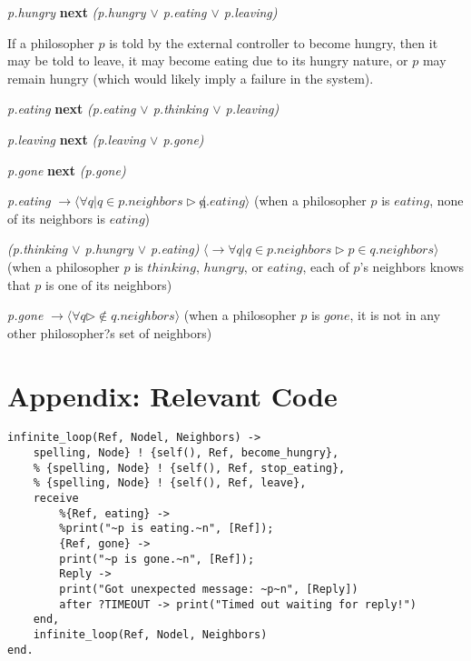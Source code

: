 \documentclass[11pt]{article}
\begin{document}
{\it p.hungry} {\bfseries next} {\it (p.hungry $\vee$ p.eating $\vee$ p.leaving)}

\indent If a philosopher $p$ is told by the external controller to become hungry, then it may be told to leave, it may become eating due to its hungry nature, or $p$ may remain hungry (which would likely imply a failure in the system).

{\it p.eating} {\bfseries next} {\it (p.eating $\vee$ p.thinking $\vee$ p.leaving)}

\indent

{\it p.leaving} {\bfseries next} {\it (p.leaving $\vee$ p.gone)}

\indent

{\it p.gone} {\bfseries next} {\it (p.gone)}

\indent

{\it p.eating} $\rightarrow \langle \forall q | q \in p.neighbors \rhd \not q.eating \rangle$
(when a philosopher $p$ is $eating$, none of its neighbors is $eating$)

\indent 

{\it (p.thinking $\vee$ p.hungry $\vee$ p.eating)} $\langle \rightarrow \forall q | q \in p.neighbors \rhd p \in q.neighbors \rangle$
(when a philosopher $p$ is $thinking$, $hungry$, or $eating$, each of $p$'s neighbors knows that $p$ is one of its neighbors)

\indent

{\it p.gone} $\rightarrow \langle \forall q  \rhd \not\in q.neighbors \rangle$
(when a philosopher $p$ is $gone$, it is not in any other philosopher?s set of neighbors)

\indent


\section{Appendix: Relevant Code}

\begin{lstlisting}
infinite_loop(Ref, Nodel, Neighbors) ->
    spelling, Node} ! {self(), Ref, become_hungry},
    % {spelling, Node} ! {self(), Ref, stop_eating},
    % {spelling, Node} ! {self(), Ref, leave},
    receive
        %{Ref, eating} ->          
        %print("~p is eating.~n", [Ref]);
        {Ref, gone} ->
        print("~p is gone.~n", [Ref]);
        Reply ->
        print("Got unexpected message: ~p~n", [Reply])
        after ?TIMEOUT -> print("Timed out waiting for reply!")
    end,
    infinite_loop(Ref, Nodel, Neighbors)
end.
\end{lstlisting}
\end{document}
